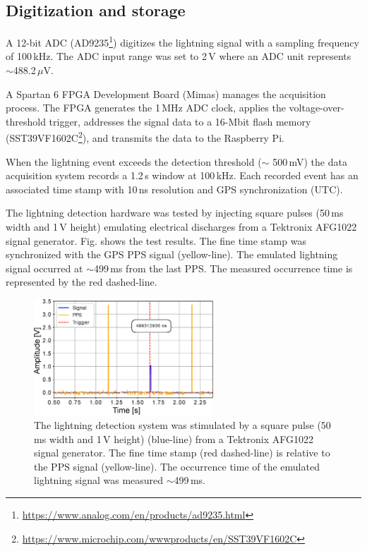 \documentclass[letterpaper,12pt]{article}
\begin{document}
\subsection{Digitization and storage}

A 12-bit ADC (AD9235\footnote{\url{https://www.analog.com/en/products/ad9235.html}}) digitizes the lightning signal with a sampling frequency of 100\,kHz. The ADC input range was set to 2\,V where an ADC unit represents $\sim$488.2\,$\mu$V. 

A Spartan 6 FPGA Development Board (Mimas) manages the acquisition process. The FPGA generates the 1\,MHz ADC clock, applies the voltage-over-threshold trigger, addresses the signal data to a 16-Mbit flash memory (SST39VF1602C\footnote{\url{https://www.microchip.com/wwwproducts/en/SST39VF1602C}}), and transmits the data to the Raspberry Pi.

When the lightning event exceeds the detection threshold ($\sim$ 500\,mV) the data acquisition system records a 1.2\,s window at 100\,kHz. Each recorded event has an associated time stamp with 10\,ns resolution and GPS synchronization (UTC).

The lightning detection hardware was tested by injecting square pulses (50\,ms width and 1\,V height) emulating electrical discharges from a Tektronix AFG1022 signal generator. Fig. shows the test results. The fine time stamp was synchronized with the GPS PPS signal (yellow-line). The emulated lightning signal occurred at $\sim$499\,ms from the last PPS. The measured occurrence time is represented by the red dashed-line.

\begin{figure}[h!]
\begin{center}
\includegraphics[width=0.6\textwidth]{Figures/test.eps}
\caption{The lightning detection system was stimulated by a square pulse (50\,ms width and 1\,V height) (blue-line) from a Tektronix AFG1022 signal generator. The fine time stamp (red dashed-line) is relative to the PPS signal (yellow-line). The occurrence time of the emulated lightning signal was measured $\sim$499\,ms. }
\label{fig::fftsignal}
\end{center}
\end{figure}
\end{document}
